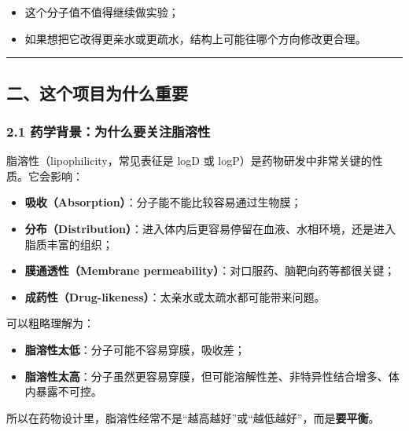 \documentclass[
  ,
]{ctexart}
\providecommand{\tightlist}{%
  \setlength{\itemsep}{0pt}\setlength{\parskip}{0pt}}
\begin{document}
\begin{itemize}
\tightlist
\item
  这个分子值不值得继续做实验；
\item
  如果想把它改得更亲水或更疏水，结构上可能往哪个方向修改更合理。
\end{itemize}

\begin{center}\rule{0.5\linewidth}{0.5pt}\end{center}

\hypertarget{ux4e8cux8fd9ux4e2aux9879ux76eeux4e3aux4ec0ux4e48ux91cdux8981}{%
\subsection{二、这个项目为什么重要}\label{ux4e8cux8fd9ux4e2aux9879ux76eeux4e3aux4ec0ux4e48ux91cdux8981}}

\hypertarget{ux836fux5b66ux80ccux666fux4e3aux4ec0ux4e48ux8981ux5173ux6ce8ux8102ux6eb6ux6027}{%
\subsubsection{2.1
药学背景：为什么要关注脂溶性}\label{ux836fux5b66ux80ccux666fux4e3aux4ec0ux4e48ux8981ux5173ux6ce8ux8102ux6eb6ux6027}}

脂溶性（lipophilicity，常见表征是 logD 或
logP）是药物研发中非常关键的性质。它会影响：

\begin{itemize}
\tightlist
\item
  \textbf{吸收（Absorption）}：分子能不能比较容易通过生物膜；
\item
  \textbf{分布（Distribution）}：进入体内后更容易停留在血液、水相环境，还是进入脂质丰富的组织；
\item
  \textbf{膜通透性（Membrane
  permeability）}：对口服药、脑靶向药等都很关键；
\item
  \textbf{成药性（Drug-likeness）}：太亲水或太疏水都可能带来问题。
\end{itemize}

可以粗略理解为：

\begin{itemize}
\tightlist
\item
  \textbf{脂溶性太低}：分子可能不容易穿膜，吸收差；
\item
  \textbf{脂溶性太高}：分子虽然更容易穿膜，但可能溶解性差、非特异性结合增多、体内暴露不可控。
\end{itemize}

所以在药物设计里，脂溶性经常不是``越高越好''或``越低越好''，而是\textbf{要平衡}。
\end{document}
